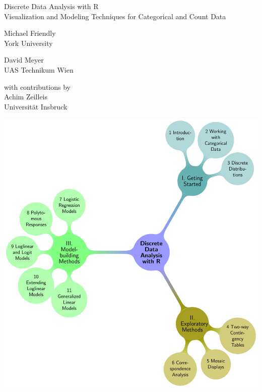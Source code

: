 \setcounter{page}{1}
\bigskip
\begin{center}
\Huge{Discrete Data Analysis with R} \\
\LARGE{Visualization and Modeling Techniques for Categorical and Count Data}
\end{center}
\bigskip
\bigskip

  \begin{minipage}[c]{.5\textwidth}
  	\begin{center}
   	{\Large Michael Friendly} \\ York University
   	\end{center}
   \end{minipage}%
  \hfill
  \begin{minipage}[c]{.5\textwidth}
		\begin{center}  
		{\Large David Meyer} \\ UAS Technikum Wien
   	\end{center}
  \end{minipage}

\bigskip
\begin{center}
with contributions by \\ {\Large Achim Zeilleis} \\ Universit\"at Insbruck
\end{center}

\bigskip
\bigskip
\bigskip
\begin{center}
	\includegraphics[width=.95\textwidth]{front/tocmap}
\end{center}


